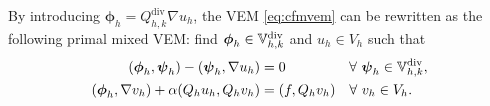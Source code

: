 \documentclass[10pt]{amsart}
\newtheorem{theorem}{Theorem}[section]
\newtheorem{lemma}[theorem]{Lemma}
\newtheorem{remark}[theorem]{Remark}
\renewcommand{\div}{\operatorname{div}}
\numberwithin{equation}{section}
\begin{document}

By introducing $\boldsymbol{\phi}_h=Q_{h,k}^{\div}\nabla u_h$, the VEM \eqref{eq:cfmvem} can be rewritten as the following primal mixed VEM: find $\boldsymbol{\phi}_h\in\mathbb{V}_{h,k}^{\rm div}$ and $u_h\in V_h$ such that
\begin{equation*}
\begin{aligned}
(\boldsymbol{\phi}_h, \boldsymbol{\psi}_h) - (\boldsymbol{\psi}_h, \nabla u_h)&=0 \quad\quad\quad\quad\;\;\forall~\boldsymbol{\psi}_h\in\mathbb{V}_{h,k}^{\rm div},\\
(\boldsymbol{\phi}_h, \nabla v_h)+\alpha(Q_hu_h, Q_hv_h)&=(f, Q_hv_h)\quad\forall~v_h\in V_h.
\end{aligned} 
\end{equation*} 



\end{document}
